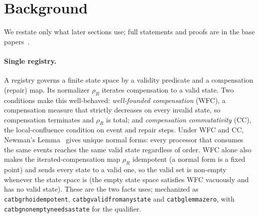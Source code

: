 \documentclass[11pt,a4paper]{article}
\theoremstyle{plain}
\theoremstyle{definition}
\theoremstyle{remark}
\renewcommand{\_}{\origunderscore\allowbreak}
\begin{document}
\section{Background}
\label{sec:background}

We restate only what later sections use; full statements and proofs are in the base
papers~\cite{blackwell2026nc, blackwell2026federated}.

\paragraph{Single registry.} A registry governs a finite state space by a validity predicate and a
compensation (repair) map. Its normalizer $\rho_R$ iterates compensation to a valid state. Two
conditions make this well-behaved: \emph{well-founded compensation} (WFC), a compensation measure
that strictly decreases on every invalid state, so compensation terminates and $\rho_R$ is total; and
\emph{compensation commutativity} (CC), the local-confluence condition on event and repair steps.
Under WFC and CC, Newman's Lemma~\cite{newman1942} gives unique normal forms: every processor that
consumes the same events reaches the same valid state regardless of order. WFC alone also makes the
iterated-compensation map $\rho_R$ idempotent (a normal form is a fixed point) and sends every state to
a valid one, so the valid set is non-empty whenever the state space is (the empty state space
satisfies WFC vacuously and has no valid state). These are the two facts  uses;
mechanized as \texttt{cat\_bg\_rho\_idempotent}, \texttt{cat\_bg\_valid\_from\_any\_state} and
\texttt{cat\_bg\_lemma\_zero}, with \texttt{cat\_bg\_nonempty\_needs\_a\_state} for the qualifier.
\end{document}
